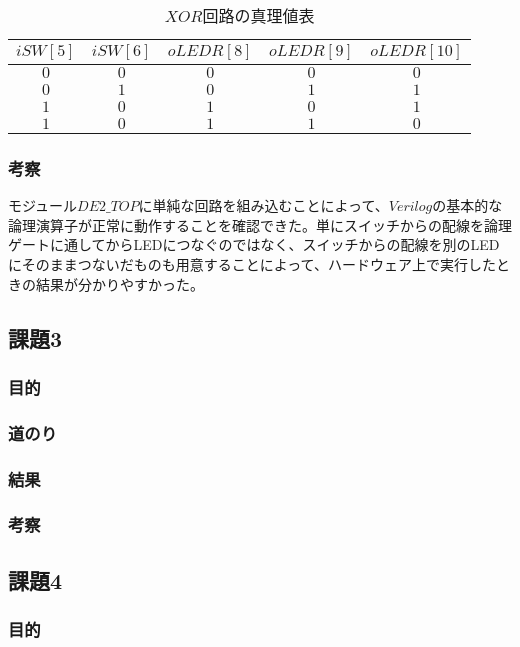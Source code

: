 \documentclass[a4paper]{jarticle}
\begin{document}
\begin{table}[ht]
	\begin{center}
		\caption{$XOR$回路の真理値表}
		\label{Work2XorGateTruthTable}
		\begin{tabular}{|c|c|c|c|c|}
			\hline
			$iSW \left[ 5 \right]$	&$iSW \left[ 6 \right]$	&$oLEDR \left[ 8 \right]$	&$oLEDR \left[ 9 \right]$	&$oLEDR \left[ 10 \right]$\\	\hline\hline
			$0$			&$0$			&$0$				&$0$				&$0$\\				\hline
			$0$			&$1$			&$0$				&$1$				&$1$\\				\hline
			$1$			&$0$			&$1$				&$0$				&$1$\\				\hline
			$1$			&$0$			&$1$				&$1$				&$0$\\				\hline
		\end{tabular}
	\end{center}
\end{table}
\subsubsection{考察}
モジュール$DE2\_TOP$に単純な回路を組み込むことによって、$Verilog$の基本的な論理演算子が正常に動作することを確認できた。単にスイッチからの配線を論理ゲートに通してからLEDにつなぐのではなく、スイッチからの配線を別のLEDにそのままつないだものも用意することによって、ハードウェア上で実行したときの結果が分かりやすかった。
\subsection{課題3}
\subsubsection{目的}
\subsubsection{道のり}
\subsubsection{結果}
\subsubsection{考察}
\subsection{課題4}
\subsubsection{目的}
\end{document}
